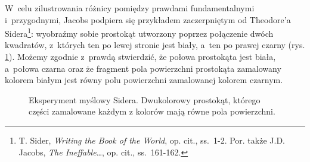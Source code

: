 W~celu zilustrowania różnicy pomiędzy prawdami fundamentalnymi i~przygodnymi, Jacobs podpiera się przykładem zaczerpniętym od Theodore'a Sidera\footnote{T. Sider, \textit{Writing the Book of the World}, op. cit., ss.~1-2. Por. także J.D. Jacobs, \textit{The Ineffable}\ldots, op. cit., ss.~161-162.}: wyobraźmy sobie prostokąt utworzony poprzez połączenie dwóch kwadratów, z~których ten po lewej stronie jest biały, a~ten po prawej czarny (rys. \ref{sil-jac-siderpic}). Możemy zgodnie z~prawdą stwierdzić, że połowa prostokąta jest biała, a~połowa czarna oraz że fragment pola powierzchni prostokąta zamalowany kolorem białym jest równy polu powierzchni zamalowanej kolorem czarnym.
\begin{figure}[H]
\begin{center}


\caption[Eksperyment myślowy Sidera]{Eksperyment myślowy Sidera. Dwukolorowy prostokąt, którego części zamalowane każdym z kolorów mają równe pola powierzchni.}\label{sil-jac-siderpic}
\end{center}
\end{figure}

